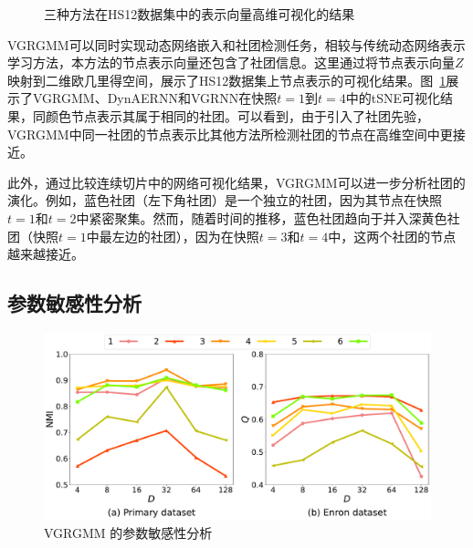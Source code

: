 \begin{figure}[htbp]
    \centering
    \caption{三种方法在HS12数据集中的表示向量高维可视化的结果}
    \label{fig:Visu}
\end{figure}

VGRGMM可以同时实现动态网络嵌入和社团检测任务，相较与传统动态网络表示学习方法，本方法的节点表示向量还包含了社团信息。这里通过将节点表示向量$Z$映射到二维欧几里得空间，展示了HS12数据集上节点表示的可视化结果。图~\ref{fig:Visu}展示了VGRGMM、DynAERNN和VGRNN在快照$t=1$到$t=4$中的tSNE可视化结果，同颜色节点表示其属于相同的社团。可以看到，由于引入了社团先验，VGRGMM中同一社团的节点表示比其他方法所检测社团的节点在高维空间中更接近。

此外，通过比较连续切片中的网络可视化结果，VGRGMM可以进一步分析社团的演化。例如，蓝色社团（左下角社团）是一个独立的社团，因为其节点在快照$t=1$和$t=2$中紧密聚集。然而，随着时间的推移，蓝色社团趋向于并入深黄色社团（快照$t=1$中最左边的社团），因为在快照$t=3$和$t=4$中，这两个社团的节点越来越接近。


\subsection{参数敏感性分析}


\begin{figure}[htbp]
    \centering
    \includegraphics[width=.7\textwidth]{figures/chap06/DimensionsOndifferentData-t.pdf}
    \caption{VGRGMM 的参数敏感性分析}
    \label{fig:Hyper}
    \vspace{0cm}
\end{figure}


